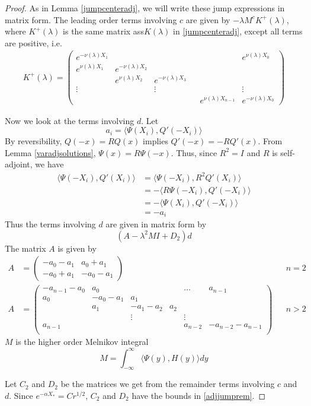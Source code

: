 \documentclass[thesis.tex]{subfiles}
\begin{document}
\begin{lemma}
\begin{proof}
As in Lemma \ref{jumpcenteradj}, we will write these jump expressions in matrix form. The leading order terms involving $c$ are given by $-\lambda M^c K^+(\lambda)$, where $K^+(\lambda)$ is the same matrix ass$K(\lambda)$ in \ref{jumpcenteradj}, except all terms are positive, i.e.
\begin{align*}
K^+(\lambda) =  
\begin{pmatrix}
e^{-\nu(\lambda)X_1} & & & & & e^{\nu(\lambda)X_0} \\
e^{\nu(\lambda)X_1} & e^{-\nu(\lambda)X_2} \\
& e^{\nu(\lambda)X_2} & e^{-\nu(\lambda)X_3} \\
\vdots & & \vdots & &&  \vdots \\
& & & & e^{\nu(\lambda)X_{n-1}} & e^{-\nu(\lambda)X_0} 
\end{pmatrix}
\end{align*}

Now we look at the terms involving $d$. Let
\[
a_i = \langle \Psi(X_i), Q'(-X_i) \rangle 
\]
By reversibility, $Q(-x) = R Q(x)$ implies $Q'(-x) = -R Q'(x)$. From Lemma \ref{varadjsolutions}, $\Psi(x) = R \Psi(-x)$. Thus, since $R^2 = I$ and $R$ is self-adjoint, we have
\begin{align*}
\langle \Psi(-X_i), Q'(X_i) \rangle &= \langle \Psi(-X_i), R^2 Q'(X_i) \rangle \\
&= -\langle R \Psi(-X_i), Q'(-X_i) \rangle \\
&= -\langle \Psi(X_i), Q'(-X_i) \rangle \\
&= -a_i
\end{align*}
Thus the terms involving $d$ are given in matrix form by
\[
(A - \lambda^2 M I + D_2)d
\]
The matrix $A$ is given by
\begin{align*}
A &= \begin{pmatrix}
-a_0 -a_1 & a_0 + a_1 \\
-a_0 + a_1 & -a_0 - a_1
\end{pmatrix} && n = 2 \\
A &= \begin{pmatrix}
-a_{n-1} - a_0 & a_0 & & & \dots & a_{n-1}\\
a_0 & -a_0 - a_1 &  a_1 \\
& a_1 & -a_1 - a_2 &  a_2 \\
& & \vdots & & \vdots \\
a_{n-1} & & & & a_{n-2} & -a_{n-2} - a_{n-1} \\
\end{pmatrix} && n > 2
\end{align*}
$M$ is the higher order Melnikov integral
\[
M = \int_{-\infty}^\infty \langle \Psi(y), H(y) \rangle dy
\]

Let $C_2$ and $D_2$ be the matrices we get from the remainder terms involving $c$ and $d$. Since $e^{-\alpha X_*} = C r^{1/2}$, $C_2$ and $D_2$ have the bounds in \cref{adjjumprem}.
\end{proof}
\end{lemma}
\end{document}
